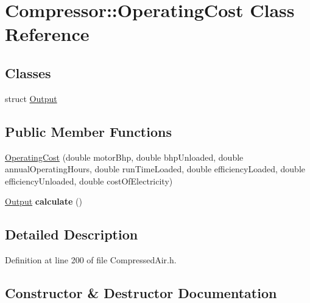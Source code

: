 \hypertarget{class_compressor_1_1_operating_cost}{}\section{Compressor\+:\+:Operating\+Cost Class Reference}
\label{class_compressor_1_1_operating_cost}
\subsection*{Classes}
\begin{DoxyCompactItemize}
\item 
struct \hyperlink{struct_compressor_1_1_operating_cost_1_1_output}{Output}
\end{DoxyCompactItemize}
\subsection*{Public Member Functions}
\begin{DoxyCompactItemize}
\item 
\hyperlink{class_compressor_1_1_operating_cost_aa5b9c984494fdfc08e31c2b7333f3657}{Operating\+Cost} (double motor\+Bhp, double bhp\+Unloaded, double annual\+Operating\+Hours, double run\+Time\+Loaded, double efficiency\+Loaded, double efficiency\+Unloaded, double cost\+Of\+Electricity)
\item 
\mbox{\label{class_compressor_1_1_operating_cost_a9778e1b3ed4a46d3f463032879fb8933}} 
\hyperlink{struct_compressor_1_1_operating_cost_1_1_output}{Output} {\bfseries calculate} ()
\end{DoxyCompactItemize}


\subsection{Detailed Description}


Definition at line 200 of file Compressed\+Air.\+h.



\subsection{Constructor \& Destructor Documentation}
\mbox{\label{class_compressor_1_1_operating_cost_aa5b9c984494fdfc08e31c2b7333f3657}} 
